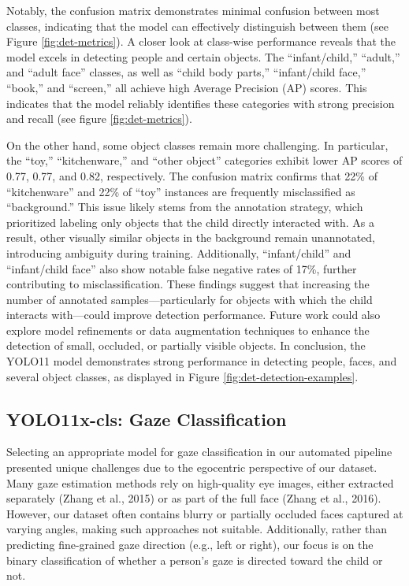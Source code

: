 \documentclass[
  man,floatsintext]{apa6}
\begin{document}
Notably, the confusion matrix demonstrates minimal confusion between most classes, indicating that the model can effectively distinguish between them (see Figure \ref{fig:det-metrics}). A closer look at class-wise performance reveals that the model excels in detecting people and certain objects. The ``infant/child,'' ``adult,'' and ``adult face'' classes, as well as ``child body parts,'' ``infant/child face,'' ``book,'' and ``screen,'' all achieve high Average Precision (AP) scores. This indicates that the model reliably identifies these categories with strong precision and recall (see figure \ref{fig:det-metrics}).

On the other hand, some object classes remain more challenging. In particular, the ``toy,'' ``kitchenware,'' and ``other object'' categories exhibit lower AP scores of 0.77, 0.77, and 0.82, respectively. The confusion matrix confirms that 22\% of ``kitchenware'' and 22\% of ``toy'' instances are frequently misclassified as ``background.'' This issue likely stems from the annotation strategy, which prioritized labeling only objects that the child directly interacted with. As a result, other visually similar objects in the background remain unannotated, introducing ambiguity during training. Additionally, ``infant/child'' and ``infant/child face'' also show notable false negative rates of 17\%, further contributing to misclassification. These findings suggest that increasing the number of annotated samples---particularly for objects with which the child interacts with---could improve detection performance. Future work could also explore model refinements or data augmentation techniques to enhance the detection of small, occluded, or partially visible objects. In conclusion, the YOLO11 model demonstrates strong performance in detecting people, faces, and several object classes, as displayed in Figure \ref{fig:det-detection-examples}.

\subsection{YOLO11x-cls: Gaze Classification}\label{sup-yolo11x-cls}

Selecting an appropriate model for gaze classification in our automated pipeline presented unique challenges due to the egocentric perspective of our dataset. Many gaze estimation methods rely on high-quality eye images, either extracted separately (Zhang et al., 2015) or as part of the full face (Zhang et al., 2016). However, our dataset often contains blurry or partially occluded faces captured at varying angles, making such approaches not suitable. Additionally, rather than predicting fine-grained gaze direction (e.g., left or right), our focus is on the binary classification of whether a person's gaze is directed toward the child or not.
\end{document}
